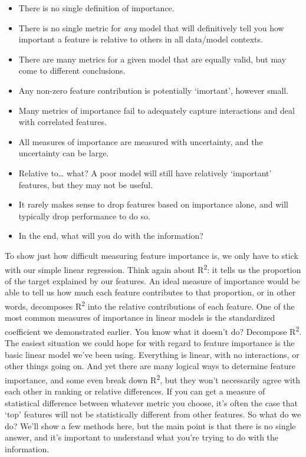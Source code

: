 \documentclass[
  letterpaper,
]{krantz}
\providecommand{\tightlist}{%
  \setlength{\itemsep}{0pt}\setlength{\parskip}{0pt}}\usepackage{longtable,booktabs,array}
\begin{document}
\begin{itemize}
\tightlist
\item
  There is no single definition of importance.
\item
  There is no single metric for \emph{any} model that will definitively
  tell you how important a feature is relative to others in all
  data/model contexts.
\item
  There are many metrics for a given model that are equally valid, but
  may come to different conclusions.
\item
  Any non-zero feature contribution is potentially `imortant', however
  small.
\item
  Many metrics of importance fail to adequately capture interactions and
  deal with correlated features.
\item
  All measures of importance are measured with uncertainty, and the
  uncertainty can be large.
\item
  Relative to\ldots{} what? A poor model will still have relatively
  `important' features, but they may not be useful.
\item
  It rarely makes sense to drop features based on importance alone, and
  will typically drop performance to do so.
\item
  In the end, what will you do with the information?
\end{itemize}

To show just how difficult measuring feature importance is, we only have
to stick with our simple linear regression. Think again about
R\textsuperscript{2}: it tells us the proportion of the target explained
by our features. An ideal measure of importance would be able to tell us
how much each feature contributes to that proportion, or in other words,
decomposes R\textsuperscript{2} into the relative contributions of each
feature. One of the most common measures of importance in linear models
is the standardized coefficient we demonstrated earlier. You know what
it doesn't do? Decompose R\textsuperscript{2}. The easiest situation we
could hope for with regard to feature importance is the basic linear
model we've been using. Everything is linear, with no interactions, or
other things going on. And yet there are many logical ways to determine
feature importance, and some even break down R\textsuperscript{2}, but
they won't necessarily agree with each other in ranking or relative
differences. If you can get a measure of statistical difference between
whatever metric you choose, it's often the case that `top' features will
not be statistically different from other features. So what do we do?
We'll show a few methods here, but the main point is that there is no
single answer, and it's important to understand what you're trying to do
with the information.
\end{document}
